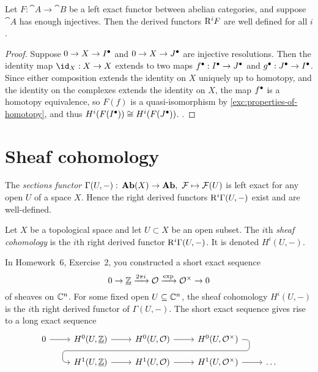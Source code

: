 \begin{cor}
	Let $F: \cat A \to \cat B$ be a left exact functor between abelian categories, and suppose $\cat A$ has enough injectives. Then the derived functors $\mathrm{R}^iF$ are well defined for all $i$. 
\end{cor}
\begin{proof}
	Suppose $0 \to X \to {I}^\bullet$ and $0 \to X \to {J}^\bullet$ are injective resolutions. Then the identity map $\id_X: X \to X$ extends to two maps ${f}^\bullet: {I}^\bullet \to {J}^\bullet$ and ${g}^\bullet: {J}^\bullet \to {I}^\bullet$. Since either composition extends the identity on $X$ uniquely up to homotopy, and the identity on the complexes extends the identity on $X$, the map ${f}^\bullet$ is a homotopy equivalence, so $F(f)$ is a quasi-isomorphism by \cref{exc:properties-of-homotopy}, and thus $H^i(F({I}^\bullet)) \cong H^i(F({J}^\bullet))$. .
\end{proof}

\section{Sheaf cohomology}

The \emph{sections functor} \(\Gamma(U,-)\colon\catAbelianSheaf(X)\to\catAbelianGroup,\ \mathcal F\mapsto\mathcal F(U)\) is left exact for any open \(U\) of a space \(X\).
Hence the right derived functors \(\mathrm{R}^i\Gamma(U,-)\) exist and are well-defined.

\begin{defn}
	Let $X$ be a topological space and let $U \subset X$ be an open subset. 
	The $i$th \emph{sheaf cohomology}  is the \(i\)th right derived functor $\mathrm{R}^i \Gamma(U, -)$. It is denoted $H^i(U, -)$.
\end{defn}

\begin{exmp}
In Homework~6, Exercise~2, you constructed a short exact sequence
\[ 0\to\underline{\mathbb{Z}}\xrightarrow{2\pi i}\mathcal O\xrightarrow{\exp}\mathcal O^\times\to 0 \]
of sheaves on \(\mathbb{C}^n\).
For some fixed open \(U\subseteq\mathbb{C}^n\), the sheaf cohomology \(H^i(U,-)\) is the \(i\)th right derived functor of \(\Gamma(U,-)\).
The short exact sequence gives rise to a long exact sequence
        \[\begin{tikzcd}[row sep=small]
            0 \ar[r] & H^0(U, \underline{\bb Z}) \ar[r] & H^0(U, \mathcal O) \ar[r] \ar[draw=none]{d}[name=X, anchor=center]{} & H^0(U, \mathcal O^\times)
            \ar[rounded corners,
            to path={ -- ([xshift=2ex]\tikztostart.east)
                      |- (X.center) \tikztonodes
                      -| ([xshift=-2ex]\tikztotarget.west)
                      -- (\tikztotarget)}]{dll}[at end]{} \\
            & H^1(U, \underline{\bb Z}) \ar[r] & H^1(U, \mathcal O) \ar[r] & H^1(U, \mathcal O^\times) \ar[r] & \ldots
        \end{tikzcd}\]
\end{exmp}

